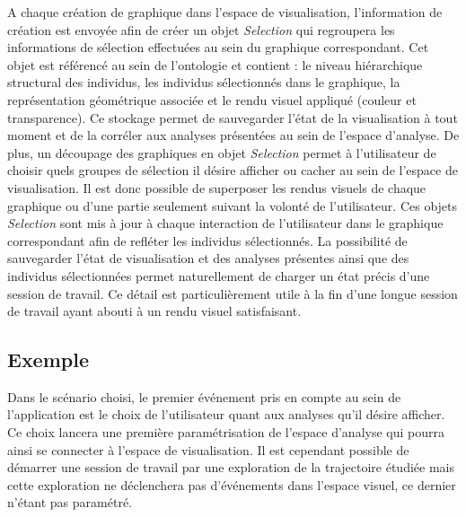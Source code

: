 A chaque création de graphique dans l'espace de visualisation, l'information de création est envoyée afin de créer un objet \textit{Selection} qui regroupera les informations de sélection effectuées au sein du graphique correspondant. Cet objet est référencé au sein de l'ontologie et contient : le niveau hiérarchique structural des individus, les individus sélectionnés dans le graphique, la représentation géométrique associée et le rendu visuel appliqué (couleur et transparence). Ce stockage permet de sauvegarder l'état de la visualisation à tout moment et de la corréler aux analyses présentées au sein de l'espace d'analyse. De plus, un découpage des graphiques en objet \textit{Selection} permet à l'utilisateur de choisir quels groupes de sélection il désire afficher ou cacher au sein de l'espace de visualisation. Il est donc possible de superposer les rendus visuels de chaque graphique ou d'une partie seulement suivant la volonté de l'utilisateur. Ces objets \textit{Selection} sont mis à jour à chaque interaction de l'utilisateur dans le graphique correspondant afin de refléter les individus sélectionnés. La possibilité de sauvegarder l'état de visualisation et des analyses présentes ainsi que des individus sélectionnées permet naturellement de charger un état précis d'une session de travail. Ce détail est particulièrement utile à la fin d'une longue session de travail ayant abouti à un rendu visuel satisfaisant.


\subsection{Exemple}

Dans le scénario choisi, le premier événement pris en compte au sein de l'application est le choix de l'utilisateur quant aux analyses qu'il désire afficher. Ce choix lancera une première paramétrisation de l'espace d'analyse qui pourra ainsi se connecter à l'espace de visualisation. 
Il est cependant possible de démarrer une session de travail par une exploration de la trajectoire étudiée mais cette exploration ne déclenchera pas d'événements dans l'espace visuel, ce dernier n'étant pas paramétré.


